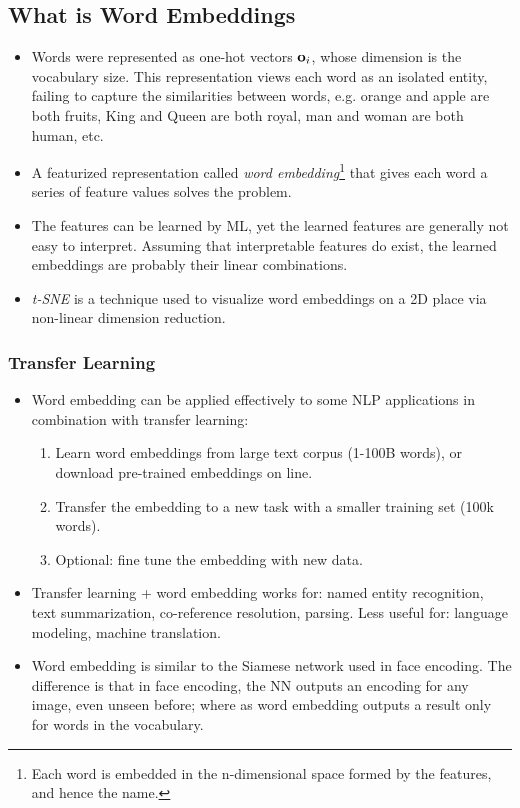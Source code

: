 \subsection{What is Word Embeddings}
\begin{itemize}
  \item Words were represented as one-hot vectors $\mathbf{o}_{i}$, whose dimension is the vocabulary size. This representation views each word as an isolated entity, failing to capture the similarities between words, e.g. orange and apple are both fruits, King and Queen are both royal, man and woman are both human, etc. 
  \item A featurized representation called \textit{word embedding}\footnote{Each word is embedded in the n-dimensional space formed by the features, and hence the name.} that gives each word a series of feature values solves the problem. 
  \item The features can be learned by ML, yet the learned features are generally not easy to interpret. Assuming that interpretable features do exist, the learned embeddings are probably their linear combinations.
  \item \textit{t-SNE} is a technique used to visualize word embeddings on a 2D place via non-linear dimension reduction. 
\end{itemize}
\subsubsection{Transfer Learning}
\begin{itemize}
  \item Word embedding can be applied effectively to some NLP applications in combination with transfer learning:
    \begin{enumerate}
      \item Learn word embeddings from large text corpus (1-100B words), or download pre-trained embeddings on line.
      \item Transfer the embedding to a new task with a smaller training set (100k words).
      \item Optional: fine tune the embedding with new data.
    \end{enumerate}
  \item Transfer learning + word embedding works for: named entity recognition, text summarization, co-reference resolution, parsing. Less useful for: language modeling, machine translation.
  \item Word embedding is similar to the Siamese network used in face encoding. The difference is that in face encoding, the NN outputs an encoding for any image, even unseen before; where as word embedding outputs a result only for words in the vocabulary.
\end{itemize}
